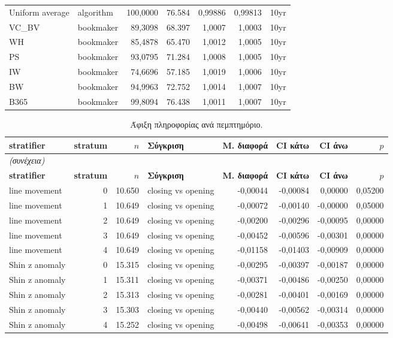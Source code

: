 {\begin{longtable}{@{}llrrrrl@{}}
Uniform average & algorithm & 100,0000 & 76.584 & 0,99886 & 0,99813 & 10yr \\
VC\_BV & bookmaker & 89,3098 & 68.397 & 1,0007 & 1,0003 & 10yr \\
WH & bookmaker & 85,4878 & 65.470 & 1,0012 & 1,0005 & 10yr \\
PS & bookmaker & 93,0795 & 71.284 & 1,0008 & 1,0005 & 10yr \\
IW & bookmaker & 74,6696 & 57.185 & 1,0019 & 1,0006 & 10yr \\
BW & bookmaker & 94,9963 & 72.752 & 1,0014 & 1,0007 & 10yr \\
B365 & bookmaker & 99,8094 & 76.438 & 1,0011 & 1,0007 & 10yr \\
\end{longtable}
}

{\scriptsize
\begin{longtable}{@{}lrrlrrrr@{}}
\caption{Άφιξη πληροφορίας ανά πεμπτημόριο.}\label{app:info}\\
\toprule \textbf{stratifier} & \textbf{stratum} & \textbf{$n$} & \textbf{Σύγκριση} & \textbf{Μ. διαφορά} & \textbf{CI κάτω} & \textbf{CI άνω} & \textbf{$p$} \\\midrule\endfirsthead
\multicolumn{8}{l}{\emph{(συνέχεια)}}\\\toprule \textbf{stratifier} & \textbf{stratum} & \textbf{$n$} & \textbf{Σύγκριση} & \textbf{Μ. διαφορά} & \textbf{CI κάτω} & \textbf{CI άνω} & \textbf{$p$} \\\midrule\endhead
\bottomrule\endfoot
line movement & 0 & 10.650 & closing vs opening & -0,00044 & -0,00084 & 0,00000 & 0,05200 \\
line movement & 1 & 10.649 & closing vs opening & -0,00072 & -0,00140 & -0,00000 & 0,05000 \\
line movement & 2 & 10.649 & closing vs opening & -0,00200 & -0,00296 & -0,00095 & 0,00000 \\
line movement & 3 & 10.649 & closing vs opening & -0,00452 & -0,00596 & -0,00301 & 0,00000 \\
line movement & 4 & 10.649 & closing vs opening & -0,01158 & -0,01403 & -0,00909 & 0,00000 \\
Shin z anomaly & 0 & 15.315 & closing vs opening & -0,00295 & -0,00397 & -0,00187 & 0,00000 \\
Shin z anomaly & 1 & 15.311 & closing vs opening & -0,00371 & -0,00486 & -0,00250 & 0,00000 \\
Shin z anomaly & 2 & 15.313 & closing vs opening & -0,00281 & -0,00401 & -0,00169 & 0,00000 \\
Shin z anomaly & 3 & 15.303 & closing vs opening & -0,00440 & -0,00562 & -0,00314 & 0,00000 \\
Shin z anomaly & 4 & 15.252 & closing vs opening & -0,00498 & -0,00641 & -0,00353 & 0,00000 \\
\end{longtable}
}

